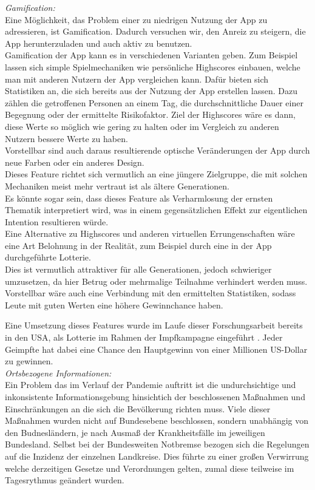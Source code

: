 \documentclass[conference]{IEEEtran}
\begin{document}
\textit{Gamification:}\\
Eine Möglichkeit, das Problem einer zu niedrigen Nutzung der App zu adressieren, ist Gamification. Dadurch versuchen wir, den Anreiz zu steigern, die App herunterzuladen und auch aktiv zu benutzen.\\ 
Gamification der App kann es in verschiedenen Varianten geben. Zum Beispiel lassen sich simple Spielmechaniken wie persönliche Highscores einbauen, welche man mit anderen Nutzern der App vergleichen kann.  Dafür bieten sich Statistiken an, die sich bereits aus der Nutzung der App erstellen lassen. Dazu zählen die getroffenen Personen an einem Tag, die durchschnittliche Dauer einer Begegnung oder der ermittelte Risikofaktor. Ziel der Highscores wäre es dann, diese Werte so möglich wie gering zu halten oder im Vergleich zu anderen Nutzern bessere Werte zu haben.\\
Vorstellbar sind auch daraus resultierende optische Veränderungen der App durch neue Farben oder ein anderes Design.\\
Dieses Feature richtet sich vermutlich an eine jüngere Zielgruppe, die mit solchen Mechaniken meist mehr vertraut ist als ältere Generationen.\\
Es könnte sogar sein, dass dieses Feature als Verharmlosung der ernsten Thematik interpretiert wird, was in einem gegensätzlichen Effekt zur eigentlichen Intention resultieren würde.\\
Eine Alternative zu Highscores und anderen virtuellen Errungenschaften wäre eine Art Belohnung in der Realität, zum Beispiel durch eine in der App durchgeführte Lotterie.\\
Dies ist vermutlich attraktiver für alle Generationen, jedoch schwieriger umzusetzen, da hier Betrug oder mehrmalige Teilnahme verhindert werden muss. Vorstellbar wäre auch eine Verbindung mit den ermittelten Statistiken, sodass Leute mit guten Werten eine höhere Gewinnchance haben.

Eine Umsetzung dieses Features wurde im Laufe dieser Forschungsarbeit bereits in den USA, als Lotterie im Rahmen der Impfkampagne eingeführt \cite{Lotto}.
Jeder Geimpfte hat dabei eine Chance den Hauptgewinn von einer Millionen US-Dollar zu gewinnen.\\

\textit{Ortsbezogene Informationen:}\\
Ein Problem das im Verlauf der Pandemie auftritt ist die undurchsichtige und inkonsistente Informationsgebung 
hinsichtich der beschlossenen Maßnahmen und Einschränkungen an die sich die Bevölkerung richten muss. 
Viele dieser Maßnahmen wurden nicht auf Bundesebene beschlossen, sondern unabhängig von den Budnesländern, je nach Ausmaß der Krankheitsfälle im jeweiligen Bundesland.
Selbst bei der Bundesweiten Notbremse bezogen sich die Regelungen auf die Inzidenz der einzelnen Landkreise. \cite{Notbremse}  
Dies führte zu einer großen Verwirrung welche derzeitigen Gesetze und Verordnungen gelten, zumal diese teilweise im Tagesrythmus geändert wurden.
\end{document}
